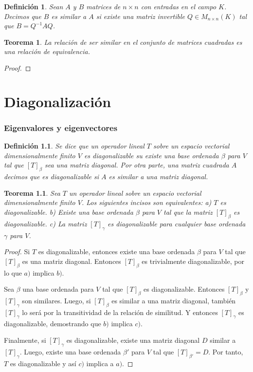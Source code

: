 \documentclass{book}
\newtheorem{theorem}{Teorema}
\newtheorem{definition}{Definición}
\begin{document}
\begin{definition}
Sean $A$ y $B$ matrices de $n \times n$ con entradas en el campo $K$. Decimos que $B$ es similar a $A$ si existe una matriz invertible $Q\in M_{n \times n}(K)$ tal que $B=Q^{-1}AQ$.
\end{definition}

\begin{theorem}
La relación de ser similar en el conjunto de matrices cuadradas es una relación de equivalencia.
\end{theorem}

\begin{proof}

\end{proof}

\chapter{Diagonalización}
\subsection{Eigenvalores y eigenvectores}

\begin{definition}
Se dice que un operador lineal $T$ sobre un espacio vectorial dimensionalmente finito $V$ es diagonalizable su existe una base ordenada $\beta$ para $V$ tal que $[T]_{\beta}$ sea una matriz diagonal. Por otra parte, una matriz cuadrada $A$ decimos que es diagonalizable si $A$ es similar a una matriz diagonal.
\end{definition}

\begin{theorem}
Sea $T$ un operador lineal sobre un espacio vectorial dimensionalmente finito $V$. Los siguientes incisos son equivalentes:
 \newline \newline
a) $T$ es diagonalizable. \newline
b) Existe una base ordenada $\beta$ para $V$ tal que la matriz $[T]_{\beta}$ es diagonalizable. \newline
c) La matriz $[T]_{\gamma}$ es diagonalizable para cualquier base ordenada $\gamma$ para $V$.
\end{theorem}

\begin{proof}
Si $T$ es diagonalizable, entonces existe una base ordenada $\beta$ para $V$ tal que $[T]_{\beta}$ es una matriz diagonal. Entonces $[T]_{\beta}$ es trivialmente diagonalizable, por lo que $a)$ implica $b)$. 

Sea $\beta$ una base ordenada para $V$ tal que $[T]_{\beta}$ es diagonalizable. Entonces $[T]_{\beta}$ y $[T]_{\gamma}$ son similares. Luego, si $[T]_{\beta}$ es similar a una matriz diagonal, también $[T]_{\gamma}$ lo será por la transitividad de la relación de similitud. Y entonces $[T]_{\gamma}$ es diagonalizable, demostrando que $b)$ implica $c)$.

Finalmente, si $[T]_{\gamma}$ es diagonalizable, existe una matriz diagonal $D$ similar a $[T]_{\gamma}$. Luego, existe una base ordenada $\beta '$ para $V$ tal que  $[T]_{\beta '}=D$. Por tanto, $T$ es diagonalizable y así $c)$ implica a $a)$.
\end{proof}
\end{document}
